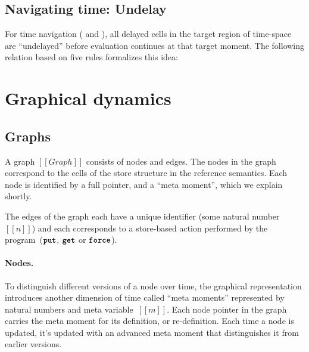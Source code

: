 \documentclass[11pt]{article}
\renewcommand{\ottkw}[1]{\textbf{\texttt{#1}}}
\begin{document}
\subsection{Navigating time: Undelay}
\label{sec:refsem-undelay}

For time navigation ( and ),
all delayed cells in the target region of time-space are ``undelayed''
before evaluation continues at that target moment.
%
The following relation based on five rules formalizes this idea:

\begin{mathpar}
\end{mathpar}


\section{Graphical dynamics}
\label{sec:graphical-dynamics}

\subsection{Graphs}
\label{sec:graphs}

A graph $[[Graph]]$ consists of nodes and edges.
%
The nodes in the graph correspond to the cells of the store structure in the reference semantics.
%
Each node is identified by a full pointer, and a ``meta moment'', which we explain shortly.

The edges of the graph each have a unique identifier (some natural number~$[[n]]$) and each corresponds to a store-based action performed by the program~($\ottkw{put}$, $\ottkw{get}$ or $\ottkw{force}$).
  
\ottgrammartabular{
  \ottGraph
}


\ottgrammartabular{
  \ottppp
}

\paragraph{Nodes.}
To distinguish different versions of a node over time,
the graphical representation introduces another dimension of time called ``meta moments''
represented by natural numbers and meta variable~$[[m]]$.
%
Each node pointer in the graph carries the meta moment for its definition, or re-definition.
%
Each time a node is updated, it's updated with an advanced meta moment that distinguishes it from earlier versions.
\end{document}
